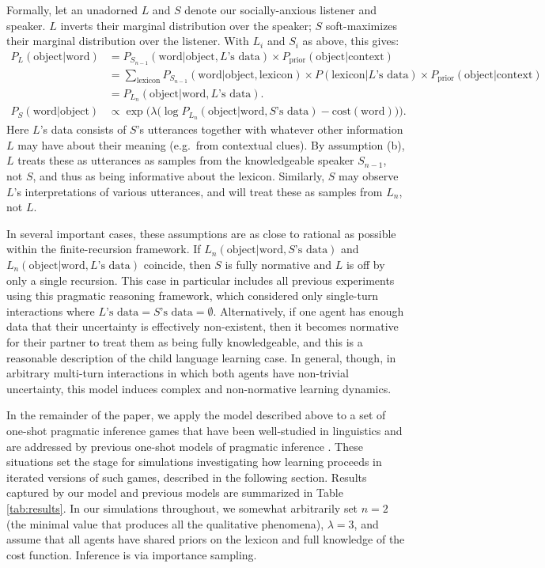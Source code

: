 \documentclass{article} %
\newcommand{\word}{\text{word}}
\newcommand{\obj}{\text{object}}
\newcommand{\lex}{\text{lexicon}}
\newcommand{\prior}{P_{\text{prior}}(\obj | \text{context})}
\begin{document}
Formally, let an unadorned $L$ and $S$ denote our socially-anxious
listener and speaker. $L$ inverts their marginal distribution over the
speaker; $S$ soft-maximizes their marginal distribution over the
listener. With $L_i$ and $S_i$ as above, this gives:
\begin{align*}
  P_L(\obj | \word) &= P_{S_{n-1}}(\word | \obj, \text{$L$'s data}) \times \prior \\
    &= \sum_\lex P_{S_{n-1}}(\word | \obj, \lex) \times P(\lex | \text{$L$'s data}) \times \prior \\
    &= P_{L_n}(\obj | \word, \text{$L$'s data}). \\
  P_S(\word | \obj) &\propto \exp\Big(\lambda \big(\log P_{L_n}(\obj | \word, \text{$S$'s data}) - \text{cost}(\word)\big)\Big).
\end{align*}
Here $L$'s data consists of $S$'s utterances together with whatever
other information $L$ may have about their meaning (e.g.~from
contextual clues). By assumption (b), $L$ treats these as utterances
as samples from the knowledgeable speaker $S_{n-1}$, not $S$, and thus
as being informative about the lexicon. Similarly, $S$ may observe
$L$'s interpretations of various utterances, and will treat these as
samples from $L_n$, not $L$.

In several important cases, these assumptions are as close to rational
as possible within the finite-recursion framework. If $L_n(\obj |
\word, \text{$S$'s data})$ and $L_n(\obj | \word, \text{$L$'s data})$
coincide, then $S$ is fully normative and $L$ is off by only a single
recursion. This case in particular includes all previous experiments
using this pragmatic reasoning framework, which considered only
single-turn interactions where $\text{$L$'s data} = \text{$S$'s data}
= \emptyset$. Alternatively, if one agent has enough data that their
uncertainty is effectively non-existent, then it becomes normative for
their partner to treat them as being fully knowledgeable, and this is
a reasonable description of the child language learning case. In
general, though, in arbitrary multi-turn interactions in which both
agents have non-trivial uncertainty, this model induces complex and
non-normative learning dynamics. 

In the remainder of the paper, we apply the model described above to a set of one-shot
pragmatic inference games that have been well-studied in linguistics
\cite{grice1975,horn1984} and are addressed by previous one-shot
models of pragmatic inference \cite{frank2012,bergen2012}. These
situations set the stage for simulations investigating how learning
proceeds in iterated versions of such games, described in the
following section. Results captured by our model and previous models
are summarized in Table \ref{tab:results}. In
  our simulations throughout, we somewhat arbitrarily set $n = 2$ (the
  minimal value that produces all the qualitative phenomena), $\lambda
  = 3$, and assume that all agents have shared priors on the lexicon
  and full knowledge of the cost function. Inference is via importance
  sampling.
\end{document}
